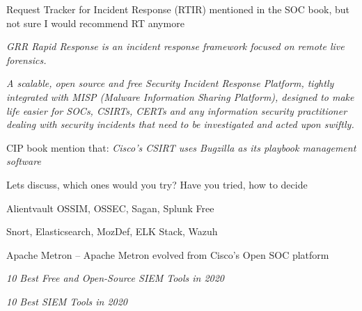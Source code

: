 \documentclass[Screen16to9,17pt]{foils}
\begin{document}
\begin{list2}
  \item {}

  \item Request Tracker for Incident Response (RTIR)  mentioned in the SOC book, but not sure I would recommend RT anymore

  \item \emph{GRR Rapid Response is an incident response framework focused on remote live forensics.}

  \item \emph{A scalable, open source and free Security Incident Response Platform, tightly integrated with MISP (Malware Information Sharing Platform), designed to make life easier for SOCs, CSIRTs, CERTs and any information security practitioner dealing with security incidents that need to be investigated and acted upon swiftly.} 

\item CIP book mention that: \emph{Cisco’s CSIRT uses Bugzilla as its playbook management 
software}

\end{list2}

\centerline{Lets discuss, which ones would you try? Have you tried, how to decide}


\begin{list2}
\item Alientvault OSSIM, OSSEC, Sagan, Splunk Free
\item Snort, Elasticsearch, MozDef, ELK Stack, Wazuh
\item Apache Metron -- Apache Metron evolved from Cisco’s Open SOC platform
\end{list2}

\emph{10 Best Free and Open-Source SIEM Tools in 2020} 

\emph{10 Best SIEM Tools in 2020} 




\begin{quote}

\end{quote}
\end{document}
